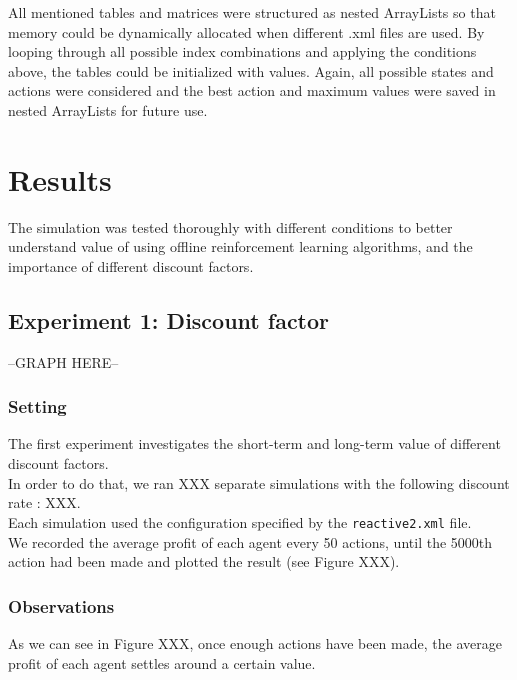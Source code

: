 \documentclass[11pt]{article}
\begin{document}
All mentioned tables and matrices were structured as nested ArrayLists so that memory could be dynamically allocated when different .xml files are used. By looping through all possible index combinations and applying the conditions above, the tables could be initialized with values. Again, all possible states and actions were considered and the best action and maximum values were saved in nested ArrayLists for future use. 

\section{Results}
The simulation was tested thoroughly with different conditions to better understand value of using offline reinforcement learning algorithms, and the importance of different discount factors. 
\subsection{Experiment 1: Discount factor}

--GRAPH HERE--

\subsubsection{Setting}
The first experiment investigates the short-term and long-term value of different discount factors.\\

In order to do that, we ran XXX separate simulations with the following discount rate : XXX.\\

Each simulation used the configuration specified by the \texttt{reactive2.xml} file.\\

We recorded the average profit of each agent every 50 actions, until the 5000th action had been made and plotted the result (see Figure XXX).\\


\subsubsection{Observations}
As we can see in Figure XXX, once enough actions have been made, the average profit of each agent settles around a certain value.\\
\end{document}
